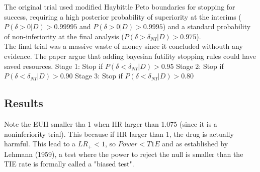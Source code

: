 \documentclass{article}\usepackage[]{graphicx}\usepackage[]{xcolor}
\begin{document}
The original trial used modified Haybittle Peto boundaries for stopping for success, requiring a high posterior probability of superiority at the interims 
($P(\delta > 0 | D) > 0.99995$ and $P(\delta > 0 | D) > 0.9995$) and a standard probability of non-inferiority at the final analysis ($P(\delta > \delta_{NI} | D) > 0.975$). \\

The final trial was a massive waste of money since it concluded withouth any evidence. The paper argue that adding bayesian futility stopping rules could have saved resources. 
Stage 1: Stop if $P(\delta < \delta_{NI} | D) > 0.95$ Stage 2: Stop if $P(\delta < \delta_{NI} | D) > 0.90$ Stage 3: Stop if $P(\delta < \delta_{NI} | D) > 0.80$

\subsection{Results}
\begin{center}
\end{center}
 
Note the EUII smaller tha 1 when HR larger than 1.075 (since it is a noninferiority trial). This because if HR larger than 1, the drug is actually harmful. 
This lead to a $LR_+ < 1$, so $Power < T1E$ and as established by Lehmann (1959), a test where the power to reject the null is smaller than the TIE rate is formally called a "biased test".
\end{document}
